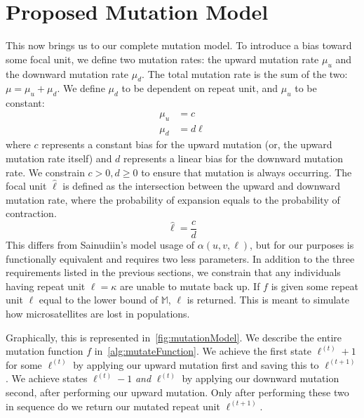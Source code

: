 \section{Proposed Mutation Model}\label{sec:proposedMutationModel}
This now brings us to our complete mutation model.
To introduce a bias toward some focal unit, we define two mutation rates: the upward mutation rate $\mu_u$ and the
downward mutation rate $\mu_d$.
The total mutation rate is the sum of the two: $\mu = \mu_u + \mu_d$.
We define $\mu_d$ to be dependent on repeat unit, and $\mu_u$ to be constant:
\begin{align}
    \mu_u &= c \\
    \mu_d &= d\ell
\end{align}
where $c$ represents a constant bias for the upward mutation (or, the upward mutation rate itself) and $d$ represents a
linear bias for the downward mutation rate.
We constrain $c > 0, d \geq 0$ to ensure that mutation is always occurring.
The focal unit $\hat{\ell}$ is defined as the intersection between the upward and downward mutation rate, where the
probability of expansion equals to the probability of contraction.
\begin{equation}
    \hat{\ell} = \frac{c}{d}
\end{equation}
This differs from Sainudiin's model usage of $\alpha(u, v, \ell)$, but for our purposes is functionally equivalent and
requires two less parameters.
In addition to the three requirements listed in the previous sections, we constrain that any individuals having repeat
unit $\ell = \kappa$ are unable to mutate back up.
If $f$ is given some repeat unit $\ell$ equal to the lower bound of $\mathbb{M}$, $\ell$ is returned.
This is meant to simulate how microsatellites are lost in populations.

Graphically, this is represented in~\autoref{fig:mutationModel}.
We describe the entire mutation function $f$ in~\autoref{alg:mutateFunction}.
We achieve the first state $\ell^{(t)} + 1$ for some $\ell^{(t)}$ by applying our upward mutation first and saving this
to $\ell^{(t+1)}$.
We achieve states $\ell^{(t)} - 1$ \emph{and} $\ell^{(t)}$ by applying our downward mutation second, after performing
our upward mutation.
Only after performing these two in sequence do we return our mutated repeat unit $\ell^{(t + 1)}$.
